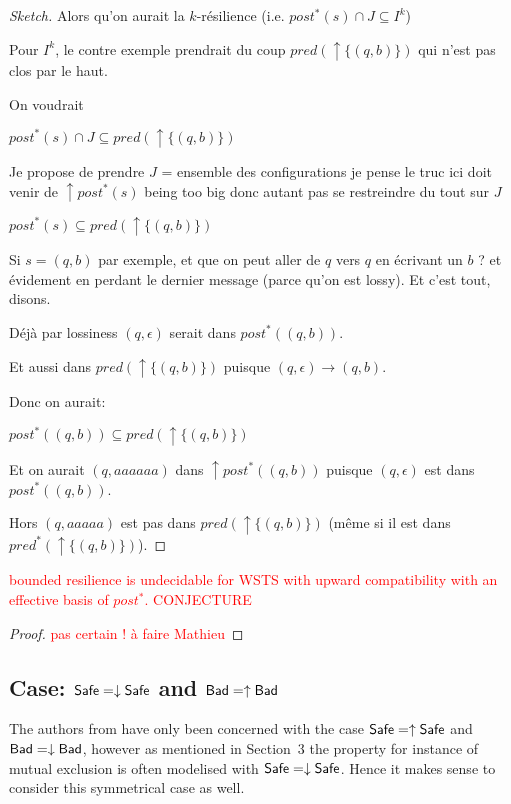 \begin{proof}[Sketch]
{Alors qu'on aurait la $k$-résilience (i.e. $post^* (s) \cap J \subseteq I^k$)

Pour $I^k$, le contre exemple prendrait du coup $pred(\uparrow \{ (q,b)\})$ qui n'est pas clos par le haut.

On voudrait

$post^*(s) \cap J \subseteq pred(\uparrow \{ (q,b)\})$


Je propose de prendre $J$ = ensemble des configurations je pense le truc ici doit venir de
$\uparrow post^* (s)$ being too big
donc autant pas se restreindre du tout sur $J$


$post^*(s) \subseteq pred(\uparrow \{ (q,b)\})$

Si $s=(q,b)$ par exemple, et que on peut aller de $q$ vers $q$ en écrivant un 
$b$ ? et évidement en perdant le dernier message (parce qu'on est lossy). Et c'est tout, disons.

Déjà par lossiness $(q,\epsilon)$ serait dans $post^*((q,b))$.

Et aussi dans $pred(\uparrow \{ (q,b)\})$ puisque $(q,\epsilon) \to (q,b)$.

Donc on aurait:

$post^*((q,b))  \subseteq pred(\uparrow \{ (q,b)\})$

Et on aurait $(q,aaaaaa)$ dans 
$\uparrow post^* ((q,b))$ puisque $(q,\epsilon)$ est dans $post^* ((q,b))$.

Hors $(q,aaaaa)$ est pas dans $pred(\uparrow \{ (q,b)\})$
(même si il est dans $pred^*(\uparrow \{ (q,b)\})$).

}
\fi 
 
\end{proof}


\begin{proposition}
\textcolor{red}{
{\sc bounded resilience} is undecidable for WSTS with upward compatibility with an effective basis of $post^*$.
CONJECTURE
}
\end{proposition}

\begin{proof}
 \textcolor{red}{pas certain ! à faire Mathieu}
\end{proof}



\subsection{Case: $\textsf{Safe} = \downarrow \textsf{Safe}$ and $\textsf{Bad} = \uparrow \textsf{Bad}$}


The authors from \cite{DBLP:conf/gg/Ozkan22,DBLP:journals/corr/abs-2108-00889}
have only been concerned with the case $\textsf{Safe} = \uparrow \textsf{Safe}$
and $\textsf{Bad} =\downarrow \textsf{Bad}$, however as mentioned in Section~3
the property for instance of mutual exclusion is often modelised with $\textsf{Safe} = \downarrow \textsf{Safe}$.
Hence it makes sense to consider this symmetrical case as well. \\

